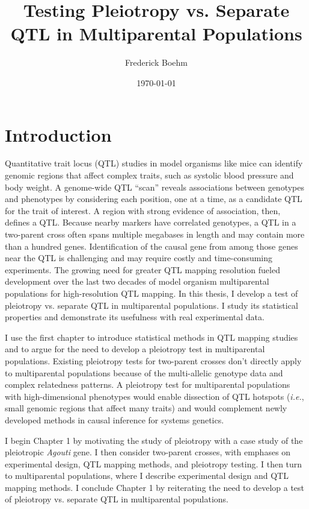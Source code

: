 \documentclass[oneside]{book}\usepackage[]{graphicx}\usepackage[]{color}
\title{Testing Pleiotropy vs. Separate QTL in Multiparental Populations}
\author{Frederick Boehm}
\date{\today}
\begin{document}
\frontmatter %




\doublespacing
\maketitle
\tableofcontents
\listoffigures
\listoftables
\mainmatter %

\chapter{Introduction}

Quantitative trait locus (QTL) studies in model organisms like mice can identify 
genomic regions that affect complex traits, such as systolic blood pressure and body weight.
A genome-wide QTL ``scan'' reveals
associations between genotypes and phenotypes by considering each position,
one at a time, as a candidate QTL for the trait of interest.
A region with strong evidence of association, then, defines a QTL. Because nearby markers have correlated
genotypes, a QTL in a two-parent cross often spans multiple megabases in length and may contain more than a hundred genes.
Identification of the causal gene from among those genes near the QTL is challenging and may require costly and time-consuming experiments. 
The growing need for greater QTL mapping resolution fueled development over the
last two decades of model organism multiparental populations for high-resolution QTL mapping.
In this thesis, I develop a test of pleiotropy vs. separate QTL in multiparental populations. I study its statistical properties and demonstrate its usefulness with real experimental data. 

I use the first chapter to introduce statistical methods in QTL mapping studies and to argue for the need to develop a pleiotropy test in multiparental populations. Existing pleiotropy tests for two-parent crosses don't directly apply to multiparental populations because of the multi-allelic genotype data and complex relatedness patterns. A pleiotropy test for multiparental populations with high-dimensional phenotypes would enable dissection of QTL hotspots (\emph{i.e.}, small genomic regions that affect many traits) and would complement newly developed methods in causal inference for systems genetics.


I begin Chapter 1 by motivating the study of
pleiotropy with a case study of the pleiotropic \emph{Agouti} gene.
I then consider two-parent crosses, with emphases on experimental design, QTL mapping methods, and pleiotropy testing. 
I then turn to multiparental populations, where I describe experimental design and QTL mapping
methods. I conclude Chapter 1 by reiterating the need to develop a test of pleiotropy vs. separate QTL in multiparental populations.
\end{document}

